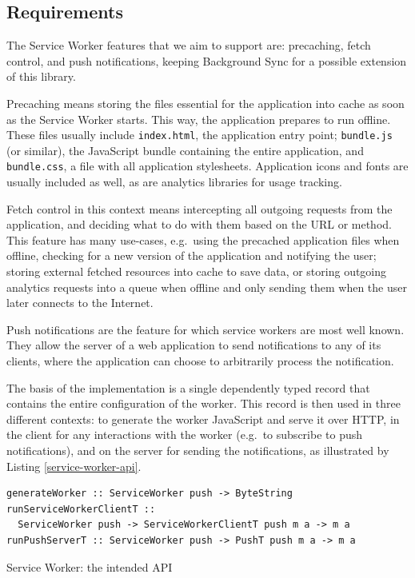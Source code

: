 \documentclass[english,zadani,odsaz]{fitthesis}
\begin{document}
\subsection{Requirements}
\label{sec:org7cbe998}
The Service Worker features that we aim to support are: precaching, fetch
control, and push notifications, keeping Background Sync for a possible
extension of this library.

Precaching means storing the files essential for the application into cache as
soon as the Service Worker starts. This way, the application prepares to run
offline. These files usually include \texttt{index.html}, the application entry point;
\texttt{bundle.js} (or similar), the JavaScript bundle containing the entire application,
and \texttt{bundle.css}, a file with all application stylesheets. Application icons and
fonts are usually included as well, as are analytics libraries for usage
tracking.

Fetch control in this context means intercepting all outgoing requests from the
application, and deciding what to do with them based on the URL or method. This
feature has many use-cases, e.g.~using the precached application files when
offline, checking for a new version of the application and notifying the user;
storing external fetched resources into cache to save data, or storing outgoing
analytics requests into a queue when offline and only sending them when the user
later connects to the Internet.

Push notifications are the feature for which service workers are most well
known. They allow the server of a web application to send notifications to any
of its clients, where the application can choose to arbitrarily process the
notification.

The basis of the implementation is a single dependently typed record that
contains the entire configuration of the worker. This record is then used in
three different contexts: to generate the worker JavaScript and serve it over
HTTP, in the client for any interactions with the worker (e.g.~to subscribe to
push notifications), and on the server for sending the notifications, as
illustrated by Listing \ref{service-worker-api}.

\begin{listing}[b]
\begin{verbatim}
generateWorker :: ServiceWorker push -> ByteString
runServiceWorkerClientT ::
  ServiceWorker push -> ServiceWorkerClientT push m a -> m a
runPushServerT :: ServiceWorker push -> PushT push m a -> m a
\end{verbatim}
\caption{Service Worker: the intended API \label{service-worker-api}}
\end{listing}
\end{document}
